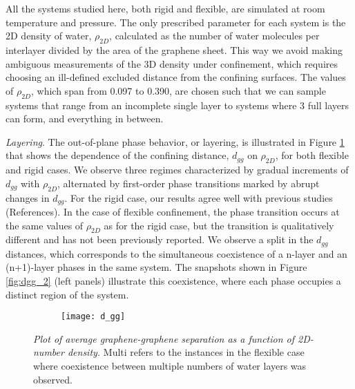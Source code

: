 \documentclass[12pt]{article}
\begin{document}
All the systems studied here, both rigid and flexible, are simulated at room temperature and pressure. The only prescribed parameter for each system is the 2D density of water, \(\rho_{2D}\), calculated as the number of water molecules per interlayer divided by the area of the graphene sheet. This way we avoid making ambiguous measurements of the 3D density under confinement, which requires choosing an ill-defined excluded distance from the confining surfaces. The values of \(\rho_{2D}\), which span from 0.097 to 0.390, are chosen such that we can sample systems that range from an incomplete single layer to systems where 3 full layers can form, and everything in between.

\textit{Layering}. The out-of-plane phase behavior, or layering, is illustrated in Figure \ref{fig:dgg_1} that shows the dependence of the confining distance, \(d_{gg}\) on \(\rho_{2D}\), for both flexible and rigid cases. We observe three regimes characterized by gradual increments of \(d_{gg}\) with \(\rho_{2D}\), alternated by first-order phase transitions marked by abrupt changes in \(d_{gg}\). For the rigid case, our results agree well with previous studies (References). In the case of flexible confinement, the phase transition occurs at the same values of \(\rho_{2D}\) as for the rigid case, but the transition is qualitatively different and has not been previously reported. We observe a split in the \(d_{gg}\) distances, which corresponds to the simultaneous coexistence of a n-layer and an (n+1)-layer phases in the same system. The snapshots shown in Figure \ref{fig:dgg_2} (left panels) illustrate this coexistence, where each phase occupies a distinct region of the system.

\begin{figure}[h!]
	\centering
	\begin{subfigure}[b]{0.39\textwidth}
    		\texttt{[image: d\_gg]}
  	\end{subfigure}
	\caption{\textit{Plot of average graphene-graphene separation as a function of 2D-number density.} Multi refers to the instances in the flexible case where coexistence between multiple numbers of water layers was observed.}
	\label{fig:dgg_1}
\end{figure}
\end{document}
